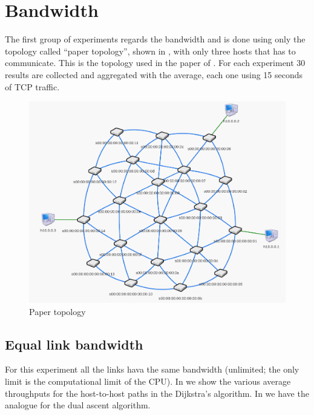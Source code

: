 \section{Bandwidth}\label{sec:bandwidth}

The first group of experiments regards the bandwidth and is done using only the
topology called ``paper topology'', shown in , with only
three hosts that has to communicate. This is the topology used in the paper of
\citeauthor{ilhan-kaplan-dualascent}. For each experiment 30 results are
collected and aggregated with the average, each one using 15 seconds of TCP
traffic.

\begin{figure}
	\centering
	\includegraphics[width=\textwidth]{img/papertopo.png}
	\caption{Paper topology}\label{fig:papertopo}
\end{figure}

\subsection{Equal link bandwidth}

For this experiment all the links hava the same bandwidth (unlimited; the only
limit is the computational limit of the CPU). In
 we show the various average throughputs for the
host-to-host paths in the Dijkstra's algorithm. In 
we have the analogue for the dual ascent algorithm.

